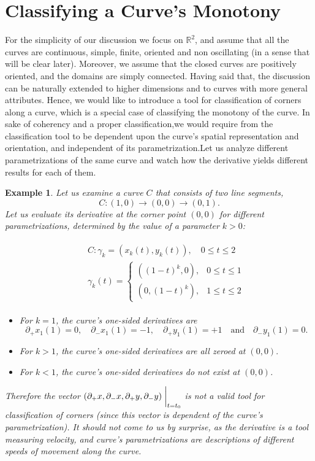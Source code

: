\documentclass[11pt]{book}
\newtheorem{exm}[thm]{Example}
\begin{document}
\section{Classifying a Curve's Monotony}
For the simplicity of our discussion we focus on $\mathbb{R}^2$, and assume that all the curves are continuous, simple, finite, oriented and non oscillating (in a sense that will be clear later). Moreover, we assume that the closed curves are positively oriented, and the domains are simply connected. Having said that, the discussion can be naturally extended to higher dimensions and to curves with more general attributes. Hence, we would like to introduce a tool for classification of corners along a curve, which is a special case of classifying the monotony of the curve. In sake of coherency and a proper classification,we would require from the classification tool to be dependent upon the curve’s spatial representation and orientation, and independent of its parametrization.Let us analyze different parametrizations of the same curve and watch how the derivative yields different results for each of them.

\begin{exm}Let us examine a curve $C$ that consists of two line segments, $$C: \left(1,0\right)\longrightarrow\left(0,0\right)\longrightarrow\left(0,1\right).$$Let us evaluate its derivative at the corner point $\left(0,0\right)$ for different parametrizations, determined by the value of a parameter $k >0$:

\begin{align}
&\begin{aligned}
 & C:\gamma_{k}=\left(x_{k}\left(t\right),y_{k}\left(t\right)\right),\quad0\leq t\leq2\\
 & \gamma_{k}\left(t\right)=\begin{cases}
\left(\left(1-t\right)^{k},0\right), & 0\leq t\leq1\\
\left(0,\left(1-t\right)^{k}\right), & 1\leq t\leq2
\end{cases}
\end{aligned}
\end{align}
\begin{itemize}
\item For $k=1$, the curve's one-sided derivatives are 
\[
\partial_{+}x_{1}\left(1\right)=0,\quad\partial_{-}x_{1}\left(1\right)=-1,\quad\partial_{+}y_{1}\left(1\right)=+1\quad\text{and}\quad\partial_{-}y_{1}\left(1\right)=0.
\]
\item For $k>1$, the curve's one-sided derivatives are all
zeroed at $\left(0,0\right).$
\item For $k<1$, the curve's one-sided derivatives do not
exist at $\left(0,0\right)$.
\end{itemize}
Therefore the vector $\left(\partial_{+}x,\partial_{-}x,\partial_{+}y,\partial_{-}y\right)\biggm\lvert_{t=t_{0}}$
is not a valid tool for classification of corners (since this vector
is dependent of the curve's parametrization). It should
not come to us by surprise, as the derivative is a tool measuring
velocity, and curve's parametrizations are descriptions of different
speeds of movement along the curve.
\end{exm}
\end{document}
